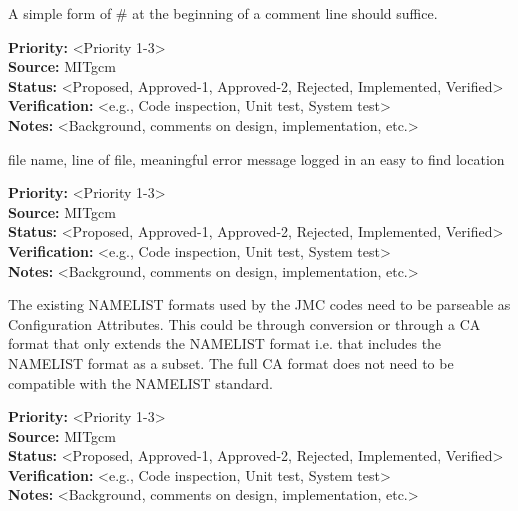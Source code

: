 



A simple form of \# at the beginning of a comment line
should suffice.

\begin{reqlist}
{\bf Priority:} <Priority 1-3> \\
{\bf Source:} MITgcm \\
{\bf Status:} <Proposed, Approved-1, Approved-2, Rejected, Implemented, Verified> \\
{\bf Verification:} <e.g., Code inspection, Unit test, System test> \\
{\bf Notes:} <Background, comments on design, implementation, etc.> 
\end{reqlist}

file name, line of file, meaningful error message logged in an easy
to find location

\begin{reqlist}
{\bf Priority:} <Priority 1-3> \\
{\bf Source:} MITgcm \\
{\bf Status:} <Proposed, Approved-1, Approved-2, Rejected, Implemented, Verified> \\
{\bf Verification:} <e.g., Code inspection, Unit test, System test> \\
{\bf Notes:} <Background, comments on design, implementation, etc.> 
\end{reqlist}

The existing NAMELIST formats used by the JMC codes need to be parseable
as Configuration Attributes. This could be through conversion or through
a CA format that only extends the NAMELIST format i.e. that includes the
NAMELIST format as a subset.
The full CA format does not need to be compatible with the NAMELIST standard.
\begin{reqlist}
{\bf Priority:} <Priority 1-3> \\
{\bf Source:} MITgcm \\
{\bf Status:} <Proposed, Approved-1, Approved-2, Rejected, Implemented, Verified> \\
{\bf Verification:} <e.g., Code inspection, Unit test, System test> \\
{\bf Notes:} <Background, comments on design, implementation, etc.> 
\end{reqlist}

